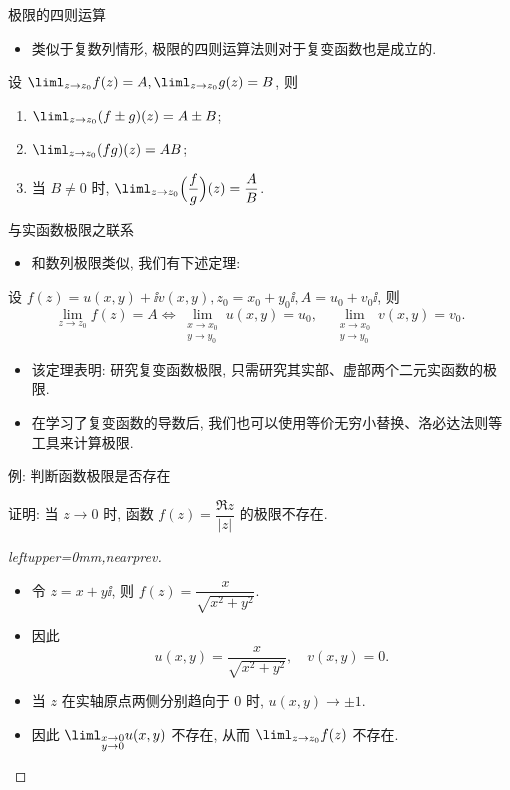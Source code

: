 \begin{frame}{极限的四则运算}
	\begin{itemize}
		\item 类似于复数列情形, 极限的四则运算法则对于复变函数也是成立的.
	\end{itemize}
	\onslide<+->
	\begin{theorem}
		设 $\liml_{z\to z_0}f(z)=A,\liml_{z\to z_0}g(z)=B$, 则
		\begin{enumerate}
			\item $\liml_{z\to z_0}(f\pm g)(z)=A\pm B$;
			\item $\liml_{z\to z_0}(fg)(z)=AB$;
			\item 当 $B\neq 0$ 时, $\liml_{z\to z_0}\Bigl(\dfrac fg\Bigr)(z)=\dfrac AB$.
		\end{enumerate}
	\end{theorem}
\end{frame}


\begin{frame}{与实函数极限之联系}
	\begin{itemize}
		\item 和数列极限类似, 我们有下述定理:
	\end{itemize}
	\onslide<+->
	\begin{theorem}
		设 $f(z)=u(x,y)+\ii v(x,y),z_0=x_0+y_0\ii,A=u_0+v_0\ii$, 则
		\[
			\lim_{z\to z_0}f(z)=A\iff
			\lim_{\substack{x\to x_0\\y\to y_0}}u(x,y)=u_0,\quad
			\lim_{\substack{x\to x_0\\y\to y_0}}v(x,y)=v_0.
		\]
	\end{theorem}
	\begin{itemize}
		\item 该定理表明: 研究复变函数极限, 只需研究其实部、虚部两个二元实函数的极限.
		\item 在学习了复变函数的导数后, 我们也可以使用等价无穷小替换、洛必达法则等工具来计算极限.
	\end{itemize}
\end{frame}


\begin{frame}{例: 判断函数极限是否存在}
	\onslide<+->
	\begin{example}[nearnext]
		证明: 当 $z\to0$ 时, 函数 $f(z)=\dfrac{\Re z}{|z|}$ 的极限不存在.
	\end{example}
	\onslide<+->
	\begin{proof}[leftupper=0mm,nearprev]
		\begin{itemize}
			\item 令 $z=x+y\ii$, 则 $f(z)=\dfrac x{\sqrt{x^2+y^2}}$.
			\item 因此
			\[
				u(x,y)=\frac x{\sqrt{x^2+y^2}},\quad v(x,y)=0.
			\]
			\item 当 $z$ 在实轴原点两侧分别趋向于 $0$ 时, $u(x,y)\to\pm1$.
			\item 因此 $\liml_{\substack{x\to 0\\y\to0}}u(x,y)$ 不存在, 从而 $\liml_{z\to z_0}f(z)$ 不存在.\qedhere
		\end{itemize}
		\meddel
	\end{proof}
\end{frame}


